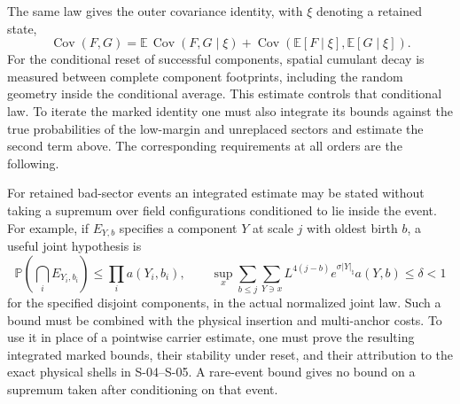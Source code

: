 \documentclass[11pt,letterpaper]{article}
\begin{document}




The same law gives the outer covariance identity, with \(\xi\) denoting a
retained state,
\[
 \operatorname{Cov}(F,G)=
  \mathbb E\,\operatorname{Cov}(F,G\mid\xi)
 +\operatorname{Cov}(\mathbb E[F\mid\xi],\mathbb E[G\mid\xi]).
\]
For the conditional reset of successful components, spatial cumulant
decay is measured between complete component footprints, including the
random geometry inside the conditional average. This estimate controls
that conditional law. To iterate the marked identity one must also
integrate its bounds against the true probabilities of the low-margin and
unreplaced sectors and estimate the second term above. The corresponding
requirements at all orders are the following.

For retained bad-sector events an integrated estimate may be stated
without taking a supremum over field configurations conditioned to lie
inside the event. For example, if \(E_{Y,b}\) specifies a component \(Y\)
at scale \(j\) with oldest birth \(b\), a useful joint hypothesis is
\[
 \mathbb P\!\left(\bigcap_i E_{Y_i,b_i}\right)\le
       \prod_i a(Y_i,b_i),\qquad
 \sup_x\sum_{b\le j}\sum_{Y\ni x}
       L^{4(j-b)}e^{\sigma |Y|_\natural}a(Y,b)\le\delta<1
\]
for the specified disjoint components, in the actual normalized joint law.
Such a bound must be combined with the physical insertion and
multi-anchor costs. To use it in place of a pointwise carrier estimate,
one must prove the resulting integrated marked bounds, their stability
under reset, and their attribution to the exact physical shells in
S-04--S-05. A rare-event bound gives no bound on a supremum taken
after conditioning on that event.
\end{document}
